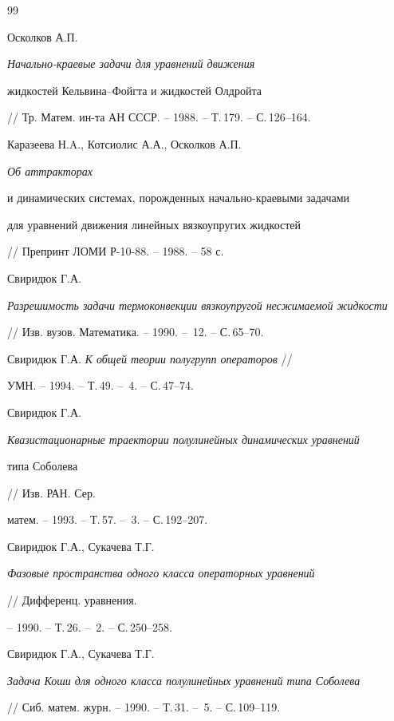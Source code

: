 \begin{thebibliography}{99}







Осколков А.П. {\it Начально-краевые задачи для уравнений движения 


жидкостей Кельвина--Фойгта и жидкостей Олдройта}


// Тр. Матем. ин-та АН СССР. -- 1988. -- Т.\,179. -- С.\,126--164.




Каразеева Н.A., Котсиолис А.А., Осколков А.П. {\it Об аттракторах 


и динамических системах, порожденных начально-краевыми задачами


для уравнений движения линейных вязкоупругих жидкостей}


// Препринт ЛОМИ Р-10-88. -- 1988. -- 58 с.




Свиридюк Г.А.


{\it Разрешимость задачи термоконвекции вязкоупругой несжимаемой жидкости}


// Изв. вузов. Математика. -- 1990. -- \No\,12. -- С.\,65--70.




Свиридюк Г.А. {\it К общей теории полугрупп операторов} //


УМН. -- 1994. -- Т.\,49. -- \No\,4. -- С.\,47--74.


 Свиридюк Г.А.


{\it Квазистационарные траектории полулинейных динамических уравнений 


типа Соболева} // Изв. РАН. Сер.


матем. -- 1993. -- Т.\,57. -- \No\,3. -- С.\,192--207.




Свиридюк Г.А., Сукачева Т.Г.


{\it Фазовые пространства одного класса операторных уравнений}


// Дифференц. уравнения.


-- 1990. -- Т.\,26. -- \No\,2. -- С.\,250--258.




Свиридюк Г.А., Сукачева Т.Г.


{\it Задача Коши для одного класса полулинейных уравнений типа Соболева}


// Сиб. матем. журн. -- 1990. -- Т.\,31. -- \No\,5. -- С.\,109--119.



\end{thebibliography}
